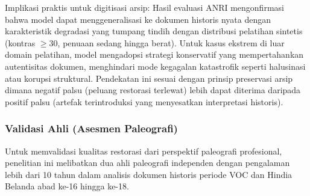 \documentclass[journal]{IEEEtran}
\begin{document}
Implikasi praktis untuk digitisasi arsip: Hasil evaluasi ANRI mengonfirmasi bahwa model dapat menggeneralisasi ke dokumen historis nyata dengan karakteristik degradasi yang tumpang tindih dengan distribusi pelatihan sintetis (kontras $\geq$30, penuaan sedang hingga berat). Untuk kasus ekstrem di luar domain pelatihan, model mengadopsi strategi konservatif yang mempertahankan autentisitas dokumen, menghindari mode kegagalan katastrofik seperti halusinasi atau korupsi struktural. Pendekatan ini sesuai dengan prinsip preservasi arsip dimana negatif palsu (peluang restorasi terlewat) lebih dapat diterima daripada positif palsu (artefak terintroduksi yang menyesatkan interpretasi historis).

\subsubsection{Validasi Ahli (Asesmen Paleografi)}

Untuk memvalidasi kualitas restorasi dari perspektif paleografi profesional, penelitian ini melibatkan dua ahli paleografi independen dengan pengalaman lebih dari 10 tahun dalam analisis dokumen historis periode VOC dan Hindia Belanda abad ke-16 hingga ke-18.
\end{document}
